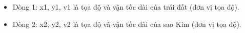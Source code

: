 \begin{itemize}
	\item     Dòng 1: x1, y1, v1 là tọa độ và vận tốc dài của trái đất (đơn vị tọa độ).   
	\item      Dòng 2: x2, y2, v2 là tọa độ và vận tốc dài của sao Kim (đơn vị tọa độ).    
\end{itemize}
